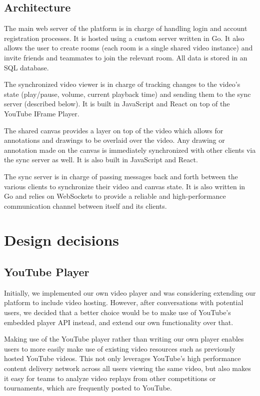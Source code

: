 \documentclass[conference]{IEEEtran}
\begin{document}
\subsection{Architecture}


  The main web server of the platform is in charge of handling login and account registration processes. It is hosted using a custom server written in Go. It also allows the user to create rooms (each room is a single shared video instance) and invite friends and teammates to join the relevant room. All data is stored in an SQL database.

  The synchronized video viewer is in charge of tracking changes to the video's state (play/pause, volume, current playback time) and sending them to the sync server (described below). It is built in JavaScript and React on top of the YouTube IFrame Player. 

  The shared canvas provides a layer on top of the video which allows for annotations and drawings to be overlaid over the video. Any drawing or annotation made on the canvas is immediately synchronized with other clients via the sync server as well. It is also built in JavaScript and React.

  The sync server is in charge of passing messages back and forth between the various clients to synchronize their video and canvas state. It is also written in Go and relies on WebSockets to provide a reliable and high-performance communication channel between itself and its clients. 

\section{Design decisions}

\subsection{YouTube Player}

  Initially, we implemented our own video player and was considering extending our platform to include video hosting. However, after conversations with potential users, we decided that a better choice would be to make use of YouTube's embedded player API instead, and extend our own functionality over that.

  Making use of the YouTube player rather than writing our own player  enables users to more easily make use of existing video resources such as previously hosted YouTube videos. This not only leverages YouTube's high performance content delivery network across all users viewing the same video, but also makes it easy for teams to analyze video replays from other competitions or tournaments, which are frequently posted to YouTube. 
\end{document}
